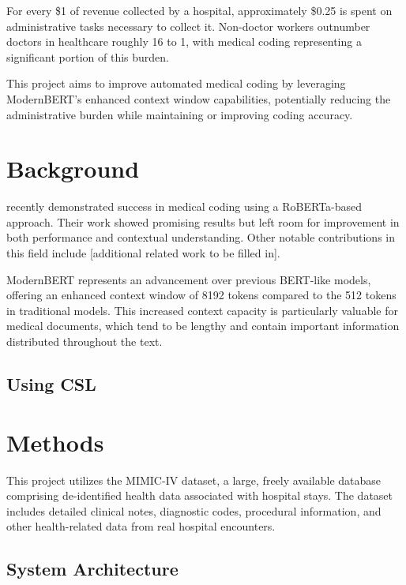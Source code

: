 \documentclass[
  authoryear,
  preprint]{elsarticle}
\begin{document}
For every \$1 of revenue collected by a hospital, approximately \$0.25
is spent on administrative tasks necessary to collect it. Non-doctor
workers outnumber doctors in healthcare roughly 16 to 1, with medical
coding representing a significant portion of this burden.

This project aims to improve automated medical coding by leveraging
ModernBERT's enhanced context window capabilities, potentially reducing
the administrative burden while maintaining or improving coding
accuracy.

\section{Background}\label{background}

\citet{edin2024explainable} recently demonstrated success in medical
coding using a RoBERTa-based approach. Their work showed promising
results but left room for improvement in both performance and contextual
understanding. Other notable contributions in this field include
{[}additional related work to be filled in{]}.

ModernBERT \citep{warner2024modernbert} represents an advancement over
previous BERT-like models, offering an enhanced context window of 8192
tokens compared to the 512 tokens in traditional models. This increased
context capacity is particularly valuable for medical documents, which
tend to be lengthy and contain important information distributed
throughout the text.

\subsection{Using CSL}\label{using-csl}

\section{Methods}\label{methods}

This project utilizes the MIMIC-IV dataset, a large, freely available
database comprising de-identified health data associated with hospital
stays. The dataset includes detailed clinical notes, diagnostic codes,
procedural information, and other health-related data from real hospital
encounters.

\subsection{System Architecture}\label{system-architecture}
\end{document}
